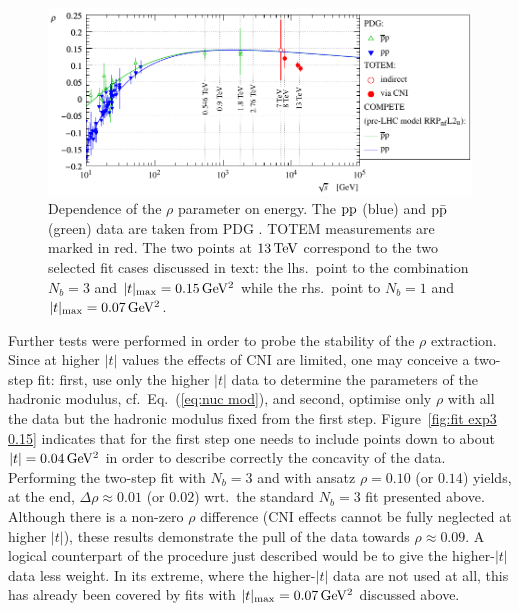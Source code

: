 \begin{figure}
\vskip-5mm
\begin{center}
\includegraphics{fig/rho_vs_s.pdf}
\caption{%
Dependence of the $\rho$ parameter on energy. The $\rm pp$ (blue) and $\rm p\bar p$ (green) data are taken from PDG \cite{pdg-2010}. TOTEM measurements are marked in red. The two points at $13\,{\rm TeV}$ correspond to the two selected fit cases discussed in text: the lhs.~point to the combination $N_b = 3$ and $|t|_{\rm max} = 0.15\,{\rm GeV^2}$ while the rhs.~point to $N_b = 1$ and $|t|_{\rm max} = 0.07\,{\rm GeV^2}$.
}
\label{fig:rho_vs_s}
\end{center}
\end{figure}

Further tests were performed in order to probe the stability of the $\rho$ extraction. Since at higher $|t|$ values the effects of CNI are limited, one may conceive a two-step fit: first, use only the higher $|t|$ data to determine the parameters of the hadronic modulus, cf.~Eq.~(\ref{eq:nuc mod}), and second, optimise only $\rho$ with all the data but the hadronic modulus fixed from the first step. Figure~\ref{fig:fit exp3 0.15} indicates that for the first step one needs to include points down to about $|t| = 0.04\,{\rm GeV^2}$ in order to describe correctly the concavity of the data. Performing the two-step fit with $N_b=3$ and with ansatz $\rho = 0.10$ (or $0.14$) yields, at the end, $\Delta\rho \approx 0.01$ (or $0.02$) wrt.~the standard $N_b=3$ fit presented above. Although there is a non-zero $\rho$ difference (CNI effects cannot be fully neglected at higher $|t|$), these results demonstrate the pull of the data towards $\rho \approx 0.09$. A logical counterpart of the procedure just described would be to give the higher-$|t|$ data less weight. In its extreme, where the higher-$|t|$ data are not used at all, this has already been covered by fits with $|t|_{\rm max} = 0.07\,{\rm GeV^2}$ discussed above.

